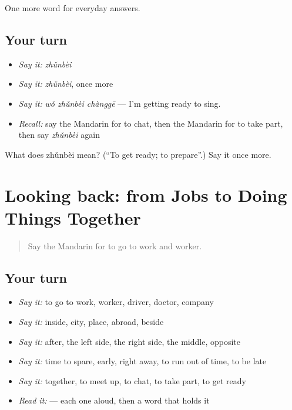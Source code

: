 \begin{grammarlens}[title={What you've built}]
One more word for everyday answers.
\end{grammarlens}

\subsection*{Your turn}
\begin{itemize}
\raggedright
  \item \emph{Say it:} \emph{zhǔnbèi}
  \item \emph{Say it:} \emph{zhǔnbèi}, once more
  \item \emph{Say it:} \emph{wǒ zhǔnbèi chànggē} — I'm getting ready to sing.
  \item \emph{Recall:} say the Mandarin for to chat, then the Mandarin for to take part, then say \emph{zhǔnbèi} again
\end{itemize}

\begin{tcolorbox}[breakable,colback=teal!4,colframe=teal!35!black,title={Before you move on}]
What does zhǔnbèi mean? (\textquotedblleft{}To get ready; to prepare\textquotedblright{}.) Say it once more.
\end{tcolorbox}
\section[(dialogue)]{Looking back: from Jobs to Doing Things Together}

\label{lesson:ZH-R84-review-80-84}



\begin{quote}
Say the Mandarin for to go to work and worker.
\end{quote}

\subsection*{Your turn}
\begin{itemize}
\raggedright
  \item \emph{Say it:} to go to work, worker, driver, doctor, company
  \item \emph{Say it:} inside, city, place, abroad, beside
  \item \emph{Say it:} after, the left side, the right side, the middle, opposite
  \item \emph{Say it:} time to spare, early, right away, to run out of time, to be late
  \item \emph{Say it:} together, to meet up, to chat, to take part, to get ready
  \item \emph{Read it:}  — each one aloud, then a word that holds it
\end{itemize}

